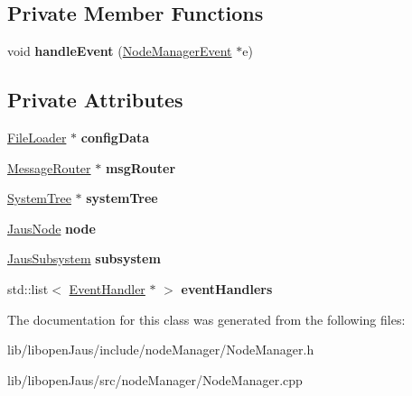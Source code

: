 \subsection*{\-Private \-Member \-Functions}
\begin{DoxyCompactItemize}
\item 
\hypertarget{class_node_manager_ae9abd4e114e16e35ff54dbdf0d95fc38}{void {\bfseries handle\-Event} (\hyperlink{class_node_manager_event}{\-Node\-Manager\-Event} $\ast$e)}\label{class_node_manager_ae9abd4e114e16e35ff54dbdf0d95fc38}

\end{DoxyCompactItemize}
\subsection*{\-Private \-Attributes}
\begin{DoxyCompactItemize}
\item 
\hypertarget{class_node_manager_a312addbc5d2e51d1318d9a2d4e11b71b}{\hyperlink{class_file_loader}{\-File\-Loader} $\ast$ {\bfseries config\-Data}}\label{class_node_manager_a312addbc5d2e51d1318d9a2d4e11b71b}

\item 
\hypertarget{class_node_manager_a7aa52180277b2acde53b77eac4000318}{\hyperlink{class_message_router}{\-Message\-Router} $\ast$ {\bfseries msg\-Router}}\label{class_node_manager_a7aa52180277b2acde53b77eac4000318}

\item 
\hypertarget{class_node_manager_a5196f6bf1364e1a3fe4f503111819515}{\hyperlink{class_system_tree}{\-System\-Tree} $\ast$ {\bfseries system\-Tree}}\label{class_node_manager_a5196f6bf1364e1a3fe4f503111819515}

\item 
\hypertarget{class_node_manager_aa095374ce6f5c02a1f1bce07327da32b}{\hyperlink{struct_jaus_node_struct}{\-Jaus\-Node} {\bfseries node}}\label{class_node_manager_aa095374ce6f5c02a1f1bce07327da32b}

\item 
\hypertarget{class_node_manager_ab9785dc407ba76b50f314cc1e4c7f5ed}{\hyperlink{struct_jaus_subsystem_struct}{\-Jaus\-Subsystem} {\bfseries subsystem}}\label{class_node_manager_ab9785dc407ba76b50f314cc1e4c7f5ed}

\item 
\hypertarget{class_node_manager_a68a6043aecd32054c16e2789d32ca2da}{std\-::list$<$ \hyperlink{class_event_handler}{\-Event\-Handler} $\ast$ $>$ {\bfseries event\-Handlers}}\label{class_node_manager_a68a6043aecd32054c16e2789d32ca2da}

\end{DoxyCompactItemize}


\-The documentation for this class was generated from the following files\-:\begin{DoxyCompactItemize}
\item 
lib/libopen\-Jaus/include/node\-Manager/\-Node\-Manager.\-h\item 
lib/libopen\-Jaus/src/node\-Manager/\-Node\-Manager.\-cpp\end{DoxyCompactItemize}
